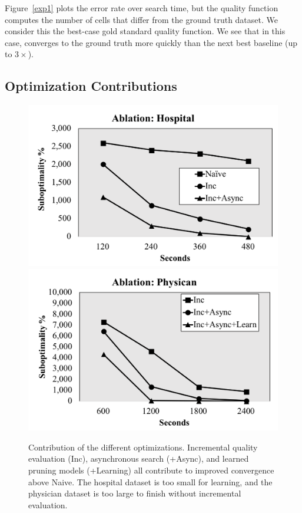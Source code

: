 Figure~\ref{exp1} plots the error rate over search time, but the quality function computes the number of cells that differ from the ground truth dataset.  We consider this the best-case gold standard quality function.
We see that in this case, \sys converges to the ground truth more quickly than the next best baseline (up to $3\times$).


\subsection{Optimization Contributions}

\begin{figure}[t]
\centering
 \includegraphics[width=0.8\columnwidth]{exp/exp7a.png}
 \includegraphics[width=0.8\columnwidth]{exp/exp7b.png}
 \caption{Contribution of the different optimizations. Incremental quality evaluation (Inc), asynchronous search (+Async), and learned pruning models (+Learning) all contribute to improved convergence above Naive. The hospital dataset is too small for learning, and the physician dataset is too large to finish without incremental evaluation. \label{exp7}}
\end{figure}


